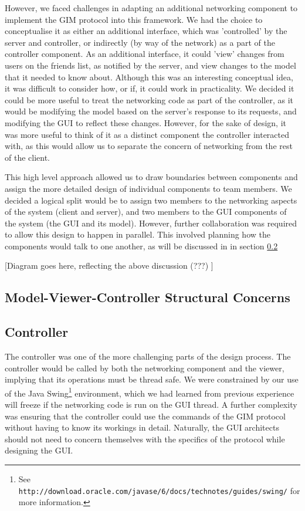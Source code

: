 However, we faced challenges in adapting an additional networking component to implement the GIM protocol into this framework. We had the choice to conceptualise it as either an additional interface, which was 'controlled' by the server and controller, or indirectly (by way of the network) as a part of the controller component. As an additional interface, it could 'view' changes from users on the friends list, as notified by the server, and view changes to the model that it needed to know about. Although this was an interesting conceptual idea, it was difficult to consider how, or if, it could work in practicality. We decided it could be more useful to treat the networking code as part of the controller, as it would be modifying the model based on the server's response to its requests, and modifying the GUI to reflect these changes. However, for the sake of design, it was more useful to think of it as a distinct component the controller interacted with, as this would allow us to separate the concern of networking from the rest of the client.
	
This high level approach allowed us to draw boundaries between components and assign the more detailed design of individual components to team members. We decided a logical split would be to assign two members to the networking aspects of the system (client and server), and two members to the GUI components of the system (the GUI and its model). However, further collaboration was required to allow this design to happen in parallel. This involved planning how the components would talk to one another, as will be discussed in in section \ref{controller}

[Diagram goes here, reflecting the above discussion (???) ]

\subsection {Model-Viewer-Controller Structural Concerns}

\subsection {Controller}
\label{controller}

The controller was one of the more challenging parts of the design process. The controller would be called by both the networking component and the viewer, implying that its operations must be thread safe. We were constrained by our use of the Java Swing\footnote{See \texttt{http://download.oracle.com/javase/6/docs/technotes/guides/swing/} for more information.} environment, which we had learned from previous experience will freeze if the networking code is run on the GUI thread. A further complexity was ensuring that the controller could use the commands of the GIM protocol without having to know its workings in detail. Naturally, the GUI architects should not need to concern themselves with the specifics of the protocol while designing the GUI.

